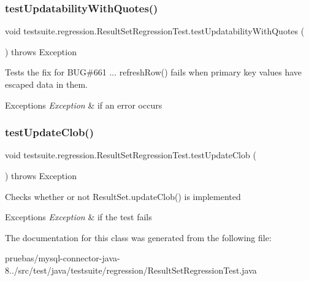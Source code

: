 \subsubsection{\texorpdfstring{test\+Updatability\+With\+Quotes()}{testUpdatabilityWithQuotes()}}
{\footnotesize\ttfamily void testsuite.\+regression.\+Result\+Set\+Regression\+Test.\+test\+Updatability\+With\+Quotes (\begin{DoxyParamCaption}{ }\end{DoxyParamCaption}) throws Exception}

Tests the fix for B\+UG\#661 ... refresh\+Row() fails when primary key values have escaped data in them.


\begin{DoxyExceptions}{Exceptions}
{\em Exception} & if an error occurs \\
\hline
\end{DoxyExceptions}
\mbox{\label{classtestsuite_1_1regression_1_1_result_set_regression_test_a996b8a0a196360051ed54e9ccc044c92}} 
\subsubsection{\texorpdfstring{test\+Update\+Clob()}{testUpdateClob()}}
{\footnotesize\ttfamily void testsuite.\+regression.\+Result\+Set\+Regression\+Test.\+test\+Update\+Clob (\begin{DoxyParamCaption}{ }\end{DoxyParamCaption}) throws Exception}

Checks whether or not Result\+Set.\+update\+Clob() is implemented


\begin{DoxyExceptions}{Exceptions}
{\em Exception} & if the test fails \\
\hline
\end{DoxyExceptions}


The documentation for this class was generated from the following file\+:\begin{DoxyCompactItemize}
\item 
pruebas/mysql-\/connector-\/java-\/8../src/test/java/testsuite/regression/Result\+Set\+Regression\+Test.\+java\end{DoxyCompactItemize}
